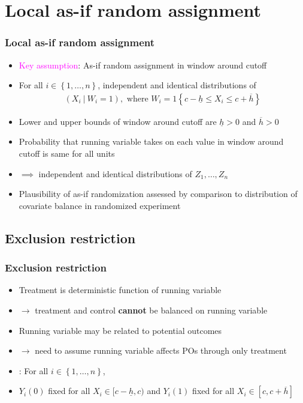 \documentclass[table, xcolor = {dvipsnames}, 9pt]{beamer}
\newcommand\given[1][]{\:#1\vert\:}
\theoremstyle{plain}
\begin{document}
\section{Local as-if random assignment}
\begin{frame}
\frametitle{Local as-if random assignment} 
\vfill
\begin{itemize} \vfill
\item \textcolor{magenta}{Key assumption}: As-if random assignment in window around cutoff \vfill
\item[] For all $i \in \left\{1, \ldots , n\right\}$, independent and identical distributions of \vfill
\begin{align*}
\left(X_i \given W_i = 1\right), \text{ where } W_i = 1\left\{c - \underline{h} \leq X_i \leq c + \overline{h}\right\}
\end{align*} \vfill
\item Lower and upper bounds of window around cutoff are $\underline{h} > 0$ and $\overline{h} > 0$  \vfill
\item Probability that running variable takes on each value in window around cutoff is same for all units \vfill
\item[] $\implies$ independent and identical distributions of $Z_1, \ldots , Z_n$ \vfill
\item Plausibility of as-if randomization assessed by comparison to distribution of covariate balance in randomized experiment \citep{hansenbowers2008} \vfill
\end{itemize} \vfill
\end{frame}
\subsection{Exclusion restriction}
\begin{frame}
\frametitle{Exclusion restriction} 
\vfill
\begin{itemize} \vfill
\item Treatment is deterministic function of running variable \vfill
\item[] $\rightarrow$ treatment and control \textbf{cannot} be balanced on running variable \vfill
\item Running variable may be related to potential outcomes \vfill
\item[] $\rightarrow$ need to assume running variable affects POs through only treatment \citep{sekhontitiunik2017} \vfill
\item {}: For all $i \in \left\{1, \ldots , n\right\}$, \vfill 
\item[] $Y_i(0)$ fixed for all $X_i \in [c - \underline{h}, c)$ and $Y_i(1)$ fixed for all $X_i \in [c, c + \overline{h}]$ \vfill
\end{itemize} \vfill
\end{frame}
\end{document}
